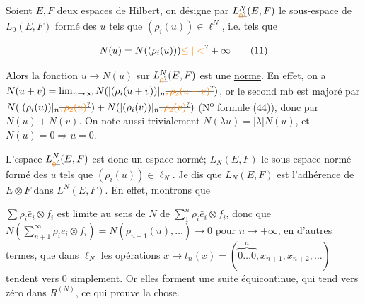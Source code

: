  Soient $E,F$ deux espaces de Hilbert,  on désigne par $L^N_{\deleted{\unsure{0}}}(E,F)$ le  sous-espace de $L_0(E,F)$ formé des $u$ tels que $(\rho_i(u))\in\ell^N$, i.e. tels que

\[
N(u)=N((\rho_i(u)))\unsure{\leq|<}+\infty\tag*{(11)}
\]

 

Alors la fonction $u\to N(u)$ sur $L^N_{\deleted{\unsure{0}}}(E,F)$ est une \uline{norme}. En effet, on a $N(u+v)=\lim_{n\to\infty}N(|(\rho_i(u+v))|_n\deleted{\unsure{,\rho_2(u+v)}})$, or le second mb est majoré par $N(|(\rho_i(u))|_n\deleted{\unsure{,\rho_2(u)}})+N(|(\rho_i(v))|_n\deleted{\unsure{,\rho_2(v)}})$ (N\textsuperscript{o} \unsure{,} formule (44)), donc par $N(u)+N(v)$. On note aussi trivialement $N(\lambda u)=|\lambda|N(u)$, et $N(u)=0\Rightarrow u=0$.


L'espace $L^N_{\deleted{\unsure{0}}}(E,F)$ est donc un espace normé;  $L_N(E,F)$ le sous-espace normé formé des $u$ tels que $(\rho_i(u))\in\ell_N$. Je dis que $L_N(E,F)$ est l'adhérence de $\overline E\otimes F$ dans $L^N(E,F)$. En effet, montrons que

$\sum\rho_i\bar e_i\otimes f_i$ est limite au sens de $N$ de $\sum_1^n\rho_i\bar e_i\otimes f_i$, donc que $N(\sum_{n+1}^\infty\rho_i\bar e_i\otimes f_i)=N(\rho_{n+1}(u),\ldots)\to 0$ pour $n\to+\infty$, en d'autres termes, que dans $\ell_N$ les opérations $x\to t_n(x)=(\overbrace{0\ldots 0}^{n},x_{n+1},x_{n+2},\ldots)$ tendent vers $0$ simplement. Or elles forment une suite équicontinue, qui tend vers zéro dans  $R^{(N)}$, ce qui prouve la chose. 


